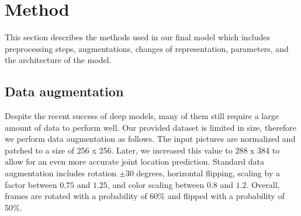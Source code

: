 %


\section{Method}\label{method}
This section describes the methods used in our final model which includes
preprocessing steps, augmentations, changes of representation, parameters, and the architecture of the model.

\subsection{Data augmentation}
Despite the recent success of deep models, many of them still require a
large amount of data to perform well.
Our provided dataset is limited in size, therefore we perform data augmentation as follows.
The input pictures are normalized and patched to a size of 256 x 256.
Later, we increased this value to 288 x 384 to allow for an even more accurate joint location prediction.
Standard data augmentation includes rotation $\pm 30$ degrees, horizontal flipping, scaling by a factor between $0.75$ and $1.25$, and color scaling between $0.8$ and $1.2$.
Overall, frames are rotated with a probability of 60\% and flipped with a probability of 50\%.


